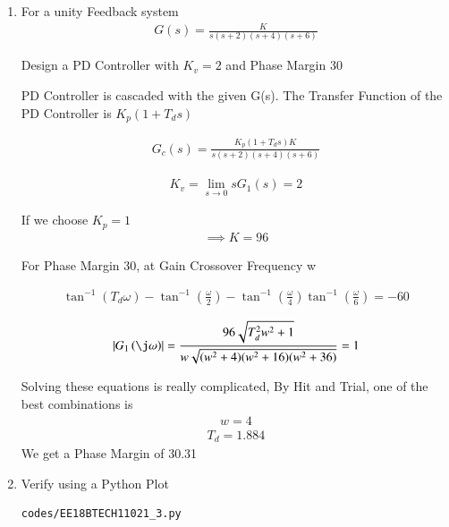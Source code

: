 \begin{enumerate}[label=\thesection.\arabic*.,ref=\thesection.\theenumi]

\item
For a unity Feedback system 
\begin{align}
    G(s) = \frac{K}{s(s+2)(s+4)(s+6)}
\end{align}


Design a PD Controller with $K_{v} = 2$ and Phase Margin 30\degree

\solution
PD Controller is cascaded with the given G(s).
The Transfer Function of the PD Controller is $K_{p}(1 + T_{d}s)$

\begin{align}
    G_{c}(s) = \frac{K_{p}(1 + T_{d}s)K}{s(s+2)(s+4)(s+6)}
\end{align}

\begin{align}
    K_{v} = \lim_{s \to 0} sG_{1}(s) = 2
\end{align}

If we choose $K_{p} = 1$
\begin{align}
    \implies K = 96
\end{align}

For Phase Margin 30\degree, at Gain Crossover Frequency w

\begin{align}
    \tan^{-1}(T_{d}\omega) - \tan^{-1}(\frac{\omega}{2}) - \tan^{-1}(\frac{\omega}{4})
    \tan^{-1}(\frac{\omega}{6}) = -60
\end{align}

\begin{align}
    \abs{G_{1}\brak{\j\omega}} = \frac{96\sqrt{T_{d}^2w^2 + 1}}{w\sqrt{(w^2+4)(w^2 + 16)(w^2 + 36)}} = 1
\end{align}

Solving these equations is really complicated,
By Hit and Trial, one of the best combinations is
\begin{align}
    w = 4
\end{align}
\begin{align}
    T_{d} = 1.884
\end{align}
We get a Phase Margin of 30.31\degree

\item
Verify using a Python Plot

\solution
\begin{lstlisting}
codes/EE18BTECH11021_3.py
\end{lstlisting}


\end{enumerate}
